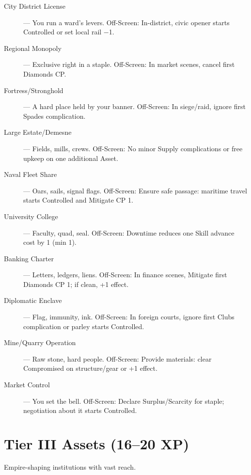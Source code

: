 \begin{description}
  \item[City District License] — You run a ward's levers. Off-Screen: In-district, civic opener starts Controlled or set local rail −1.
  \item[Regional Monopoly] — Exclusive right in a staple. Off-Screen: In market scenes, cancel first Diamonds CP.
  \item[Fortress/Stronghold] — A hard place held by your banner. Off-Screen: In siege/raid, ignore first Spades complication.
  \item[Large Estate/Demesne] — Fields, mills, crews. Off-Screen: No minor Supply complications or free upkeep on one additional Asset.
  \item[Naval Fleet Share] — Oars, sails, signal flags. Off-Screen: Ensure safe passage: maritime travel starts Controlled and Mitigate CP 1.
  \item[University College] — Faculty, quad, seal. Off-Screen: Downtime reduces one Skill advance cost by 1 (min 1).
  \item[Banking Charter] — Letters, ledgers, liens. Off-Screen: In finance scenes, Mitigate first Diamonds CP 1; if clean, +1 effect.
  \item[Diplomatic Enclave] — Flag, immunity, ink. Off-Screen: In foreign courts, ignore first Clubs complication or parley starts Controlled.
  \item[Mine/Quarry Operation] — Raw stone, hard people. Off-Screen: Provide materials: clear Compromised on structure/gear or +1 effect.
  \item[Market Control] — You set the bell. Off-Screen: Declare Surplus/Scarcity for staple; negotiation about it starts Controlled.
\end{description}

\section{Tier III Assets (16–20 XP)}

Empire-shaping institutions with vast reach.

